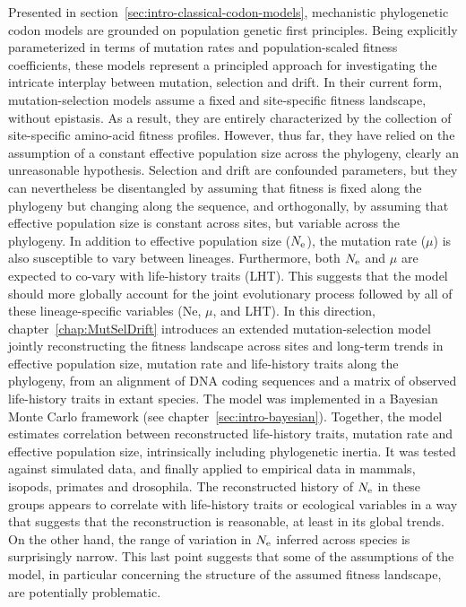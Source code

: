 Presented in section~\ref{sec:intro-classical-codon-models}, mechanistic phylogenetic codon models are grounded on population genetic first principles.
Being explicitly parameterized in terms of mutation rates and population-scaled fitness coefficients, these models represent a principled approach for investigating the intricate interplay between mutation, selection and drift.
In their current form, mutation-selection models assume a fixed and site-specific fitness landscape, without epistasis.
As a result, they are entirely characterized by the collection of site-specific amino-acid fitness profiles.
However, thus far, they have relied on the assumption of a constant effective population size across the phylogeny, clearly an unreasonable hypothesis.
Selection and drift are confounded parameters, but they can nevertheless be disentangled by assuming that fitness is fixed along the phylogeny but changing along the sequence, and orthogonally, by assuming that effective population size is constant across sites, but variable across the phylogeny.
In addition to effective population size ($N_{\text{e}}$), the mutation rate ($\mu$) is also susceptible to vary between lineages.
Furthermore, both $N_{\text{e}}$ and $\mu$ are expected to co-vary with life-history traits (\acrshort{LHT}).
This suggests that the model should more globally account for the joint evolutionary process followed by all of these lineage-specific variables (Ne, $\mu$, and LHT).
In this direction, chapter~\ref{chap:MutSelDrift} introduces an extended mutation-selection model jointly reconstructing the fitness landscape across sites and long-term trends in effective population size, mutation rate and life-history traits along the phylogeny, from an alignment of \acrshort{DNA} coding sequences and a matrix of observed life-history traits in extant species.
The model was implemented in a Bayesian Monte Carlo framework (see chapter~\ref{sec:intro-bayesian}).
Together, the model estimates correlation between reconstructed life-history traits, mutation rate and effective population size, intrinsically including phylogenetic inertia.
It was tested against simulated data, and finally applied to empirical data in mammals, isopods, primates and drosophila.
The reconstructed history of $N_{\text{e}}$ in these groups appears to correlate with life-history traits or ecological variables in a way that suggests that the reconstruction is reasonable, at least in its global trends.
On the other hand, the range of variation in $N_{\text{e}}$ inferred across species is surprisingly narrow.
This last point suggests that some of the assumptions of the model, in particular concerning the structure of the assumed fitness landscape, are potentially problematic.

